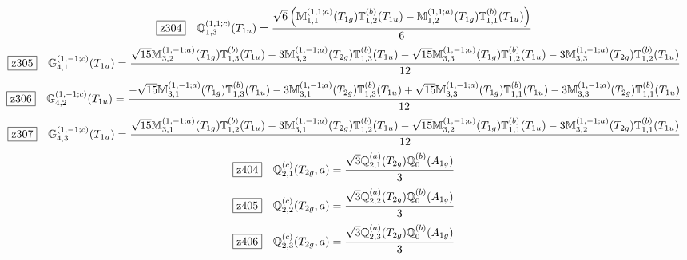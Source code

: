 \documentclass[fleqn,10pt,landscape]{jsarticle}
\begin{document}
\begin{dmath*}
\hspace*{3mm}\fbox{z304}\quad \mathbb{Q}_{1,3}^{(1,1;c)}(T_{1u})=\frac{\sqrt{6} \left(\mathbb{M}_{1,1}^{(1,1;a)}(T_{1g}) \mathbb{T}_{1,2}^{(b)}(T_{1u}) - \mathbb{M}_{1,2}^{(1,1;a)}(T_{1g}) \mathbb{T}_{1,1}^{(b)}(T_{1u})\right)}{6}
\end{dmath*}
\begin{dmath*}
\hspace*{3mm}\fbox{z305}\quad \mathbb{G}_{4,1}^{(1,-1;c)}(T_{1u})=\frac{\sqrt{15} \mathbb{M}_{3,2}^{(1,-1;a)}(T_{1g}) \mathbb{T}_{1,3}^{(b)}(T_{1u}) - 3 \mathbb{M}_{3,2}^{(1,-1;a)}(T_{2g}) \mathbb{T}_{1,3}^{(b)}(T_{1u}) - \sqrt{15} \mathbb{M}_{3,3}^{(1,-1;a)}(T_{1g}) \mathbb{T}_{1,2}^{(b)}(T_{1u}) - 3 \mathbb{M}_{3,3}^{(1,-1;a)}(T_{2g}) \mathbb{T}_{1,2}^{(b)}(T_{1u})}{12}
\end{dmath*}
\begin{dmath*}
\hspace*{3mm}\fbox{z306}\quad \mathbb{G}_{4,2}^{(1,-1;c)}(T_{1u})=\frac{- \sqrt{15} \mathbb{M}_{3,1}^{(1,-1;a)}(T_{1g}) \mathbb{T}_{1,3}^{(b)}(T_{1u}) - 3 \mathbb{M}_{3,1}^{(1,-1;a)}(T_{2g}) \mathbb{T}_{1,3}^{(b)}(T_{1u}) + \sqrt{15} \mathbb{M}_{3,3}^{(1,-1;a)}(T_{1g}) \mathbb{T}_{1,1}^{(b)}(T_{1u}) - 3 \mathbb{M}_{3,3}^{(1,-1;a)}(T_{2g}) \mathbb{T}_{1,1}^{(b)}(T_{1u})}{12}
\end{dmath*}
\begin{dmath*}
\hspace*{3mm}\fbox{z307}\quad \mathbb{G}_{4,3}^{(1,-1;c)}(T_{1u})=\frac{\sqrt{15} \mathbb{M}_{3,1}^{(1,-1;a)}(T_{1g}) \mathbb{T}_{1,2}^{(b)}(T_{1u}) - 3 \mathbb{M}_{3,1}^{(1,-1;a)}(T_{2g}) \mathbb{T}_{1,2}^{(b)}(T_{1u}) - \sqrt{15} \mathbb{M}_{3,2}^{(1,-1;a)}(T_{1g}) \mathbb{T}_{1,1}^{(b)}(T_{1u}) - 3 \mathbb{M}_{3,2}^{(1,-1;a)}(T_{2g}) \mathbb{T}_{1,1}^{(b)}(T_{1u})}{12}
\end{dmath*}
\begin{dmath*}
\hspace*{3mm}\fbox{z404}\quad \mathbb{Q}_{2,1}^{(c)}(T_{2g},a)=\frac{\sqrt{3} \mathbb{Q}_{2,1}^{(a)}(T_{2g}) \mathbb{Q}_{0}^{(b)}(A_{1g})}{3}
\end{dmath*}
\begin{dmath*}
\hspace*{3mm}\fbox{z405}\quad \mathbb{Q}_{2,2}^{(c)}(T_{2g},a)=\frac{\sqrt{3} \mathbb{Q}_{2,2}^{(a)}(T_{2g}) \mathbb{Q}_{0}^{(b)}(A_{1g})}{3}
\end{dmath*}
\begin{dmath*}
\hspace*{3mm}\fbox{z406}\quad \mathbb{Q}_{2,3}^{(c)}(T_{2g},a)=\frac{\sqrt{3} \mathbb{Q}_{2,3}^{(a)}(T_{2g}) \mathbb{Q}_{0}^{(b)}(A_{1g})}{3}
\end{dmath*}
\end{document}
